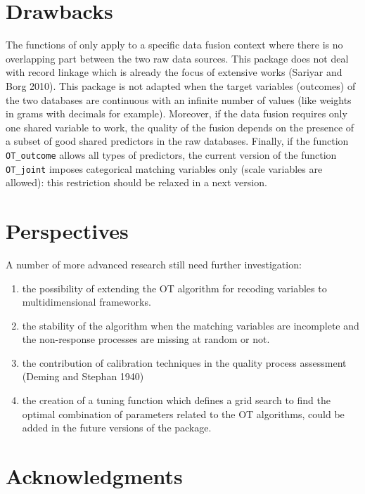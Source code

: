 \hypertarget{drawbacks}{%
\section{Drawbacks}\label{drawbacks}}

The functions of  only apply to a specific data fusion context where there is no overlapping part between the two raw data sources. This package does not deal with record linkage which is already the focus of extensive works (Sariyar and Borg 2010). This package is not adapted when the target variables (outcomes) of the two databases are continuous with an infinite number of values (like weights in grams with decimals for example). Moreover, if the data fusion requires only one shared variable to work, the quality of the fusion depends on the presence of a subset of good shared predictors in the raw databases. Finally, if the function \texttt{OT\_outcome} allows all types of predictors, the current version of the function \texttt{OT\_joint} imposes categorical matching variables only (scale variables are allowed): this restriction should be relaxed in a next version.

\hypertarget{perspectives}{%
\section{Perspectives}\label{perspectives}}

A number of more advanced research still need further investigation:

\begin{enumerate}
\def\labelenumi{\arabic{enumi}.}
\tightlist
\item
  the possibility of extending the OT algorithm for recoding variables to multidimensional frameworks.
\item
  the stability of the algorithm when the matching variables are incomplete and the non-response processes
  are missing at random or not.
\item
  the contribution of calibration techniques in the quality process assessment (Deming and Stephan 1940)
\item
  the creation of a tuning function which defines a grid search to find the optimal combination of parameters
  related to the OT algorithms, could be added in the future versions of the package.
\end{enumerate}

\hypertarget{acknowledgments}{%
\section{Acknowledgments}\label{acknowledgments}}

